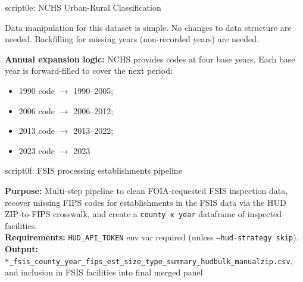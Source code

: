 \documentclass[aspectratio=169]{beamer}
\begin{document}
\begin{frame}{script0e: NCHS Urban-Rural Classification}

Data manipulation for this dataset is simple. No changes to data structure are needed. Backfilling for missing years (non-recorded years) are needed. 

\vspace{0.3em}

\textbf{Annual expansion logic:} NCHS provides codes at four base years. Each base year is forward-filled to cover the next period:
\begin{itemize}\small
    \item 1990 code $\rightarrow$ 1990--2005; 
    \item 2006 code $\rightarrow$ 2006--2012; 
    \item 2013 code $\rightarrow$ 2013--2022; 
    \item 2023 code $\rightarrow$ 2023
\end{itemize}
\end{frame}

\begin{frame}{script0f: FSIS processing establishments pipeline}\label{0f}

\textbf{Purpose:} Multi-step pipeline to clean FOIA-requested FSIS inspection data, recover missing FIPS codes for establishments in the FSIS data via the HUD ZIP-to-FIPS crosswalk, and create a \texttt{county x year} dataframe of inspected facilities. \\
\vspace{0.3em}
\textbf{Requirements:} \texttt{HUD\_API\_TOKEN} env var required (unless \texttt{--hud-strategy skip}). \\
\vspace{0.3em}
\vspace{0.3em}
\textbf{Output:} \texttt{*\_fsis\_county\_year\_fips\_est\_size\_type\_summary\_hudbulk\_manualzip.csv}, and inclusion in FSIS facilities into final merged panel

\end{frame}
\end{document}

